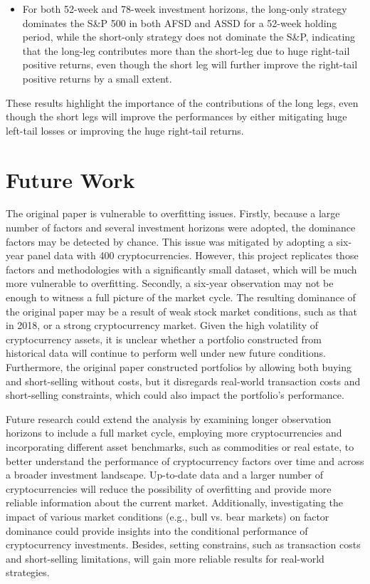 \documentclass{article}
\begin{document}
\begin{itemize}
\begin{itemize}
        \item For both 52-week and 78-week investment horizons, the long-only strategy dominates the S\&P 500 in both AFSD and ASSD for a 52-week holding period, while the short-only strategy does not dominate the S\&P, indicating that the long-leg contributes more than the short-leg due to huge right-tail positive returns, even though the short leg will further improve the right-tail positive returns by a small extent.
    \end{itemize}
\end{itemize}

These results highlight the importance of the contributions of the long legs, even though the short legs will improve the performances by either mitigating huge left-tail losses or improving the huge right-tail returns.

\hypertarget{future-work}{%
\section{Future Work}\label{future-work}}



The original paper is vulnerable to overfitting issues. Firstly, because a large number of factors and several investment horizons were adopted, the dominance factors may be detected by chance. This issue was mitigated by adopting a six-year panel data with 400 cryptocurrencies. However, this project replicates those factors and methodologies with a significantly small dataset, which will be much more vulnerable to overfitting. Secondly, a six-year observation may not be enough to witness a full picture of the market cycle. The resulting dominance of the original paper may be a result of weak stock market conditions, such as that in 2018, or a strong cryptocurrency market. Given the high volatility of cryptocurrency assets, it is unclear whether a portfolio constructed from historical data will continue to perform well under new future conditions. Furthermore, the original paper constructed portfolios by allowing both buying and short-selling without costs, but it disregards real-world transaction costs and short-selling constraints, which could also impact the portfolio's performance.

Future research could extend the analysis by examining longer observation horizons to include a full market cycle, employing more cryptocurrencies and incorporating different asset benchmarks, such as commodities or real estate, to better understand the performance of cryptocurrency factors over time and across a broader investment landscape. Up-to-date data and a larger number of cryptocurrencies will reduce the possibility of overfitting and provide more reliable information about the current market. Additionally, investigating the impact of various market conditions (e.g., bull vs. bear markets) on factor dominance could provide insights into the conditional performance of cryptocurrency investments. Besides, setting constrains, such as  transaction costs and short-selling limitations, will gain more reliable results for real-world strategies.
\end{document}
